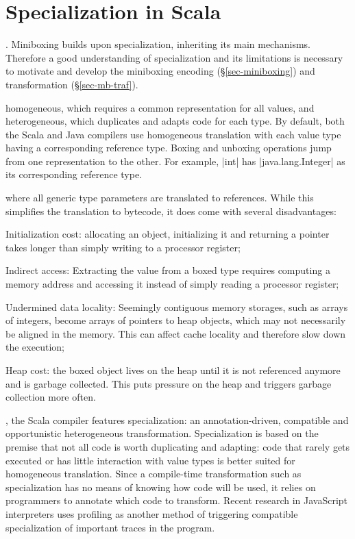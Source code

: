\section{Specialization in Scala}
\label{sec-generics}

. Miniboxing builds upon specialization, inheriting its main mechanisms. Therefore a good understanding of specialization and its limitations is necessary to motivate and develop the miniboxing encoding (\S\ref{sec-miniboxing}) and transformation (\S\ref{sec-mb-traf}).

 homogeneous, which requires a common representation for all values, and heterogeneous, which duplicates and adapts code for each type. By default, both the Scala and Java compilers use homogeneous translation with each value type having a corresponding reference type. Boxing and unboxing operations jump from one representation to the other. For example, |int| has |java.lang.Integer| as its corresponding reference type.

 where all generic type parameters are translated to references. While this simplifies the translation to bytecode, it does come with several disadvantages: 
\begin{packed_item}
\item Initialization cost: allocating an object, initializing it and returning a pointer takes longer than simply writing to a processor register;
\item Indirect access: Extracting the value from a boxed type requires computing a memory address and accessing it instead of simply reading a processor register;
\item Undermined data locality: Seemingly contiguous memory storages, such as arrays of integers, become arrays of pointers to heap objects, which may not necessarily be aligned in the memory. This can affect cache locality and therefore slow down the execution;
\item Heap cost: the boxed object lives on the heap until it is not referenced anymore and is garbage collected. This puts pressure on the heap and triggers garbage collection more often. 
\end{packed_item}

, the Scala compiler features specialization: an annotation-driven, compatible and opportunistic heterogeneous transformation. Specialization is based on the premise that not all code is worth duplicating and adapting: code that rarely gets executed or has little interaction with value types is better suited for homogeneous translation. Since a compile-time transformation such as specialization has no means of knowing how code will be used, it relies on programmers to annotate which code to transform. Recent research in JavaScript interpreters \cite{tracemonkey, truffle} uses profiling as another method of triggering compatible specialization of important traces in the program.  

